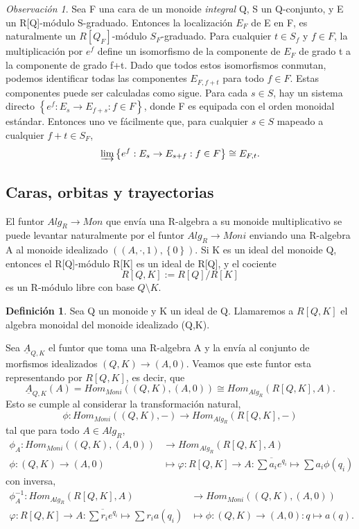 \documentclass[12pt,spanish]{amsart}
\newcommand{\set}[1]{\left\{{#1}\right\}}
\theoremstyle{definition}
\newtheorem{Def}[Theorem]{Definición}
\theoremstyle{remark}
\newtheorem{obs}[Theorem]{Observación}
\begin{document}
\begin{obs}
Sea F una cara de un monoide \textit{integral} Q, S un Q-conjunto, y E un R[Q]-módulo S-graduado. Entonces la localización $E_{F}$ de E en F, es naturalmente un $R[Q_{F}]$-módulo $S_{F}$-graduado. Para cualquier $t\in S_{f}$ y $f\in F$, la multiplicación por $e^{f}$ define un isomorfismo de la componente de $E_{F}$ de grado t a la componente de grado f+t. Dado que todos estos isomorfismos conmutan, podemos identificar todas las componentes $E_{F,f+t}$ para todo $f\in F$. Estas componentes puede ser calculadas como sigue. Para cada $s\in S$, hay un sistema directo $\set{e^{f}: E_{s} \to E_{f+s}: f\in F}$, donde F es equipada con el orden monoidal estándar. Entonces uno ve fácilmente que, para cualquier $s\in S$ mapeado a cualquier $f+t\in S_{F}$,
$$\varinjlim \set{e^{f}:E_{s} \to E_{s+f}:f\in F} \cong E_{F,t}.$$
\end{obs}
 






\subsection{Caras, orbitas y trayectorias}
El funtor $Alg_{R} \to Mon$ que envía una R-algebra a su monoide multiplicativo se puede levantar naturalmente por el funtor $Alg_{R} \to Moni$ enviando una R-algebra A al monoide idealizado $((A,\cdot,1),\set{0})$. Si K es un ideal del monoide Q, entonces el R[Q]-módulo R[K] es un ideal de R[Q], y el cociente 
$$R[Q,K]:=R[Q]/R[K]$$
es un R-módulo libre con base $Q\setminus K$. \\

\begin{Def}
Sea Q un monoide y K un ideal de Q. Llamaremos a $R[Q,K]$ el algebra monoidal del monoide idealizado (Q,K). 
\end{Def}

Sea $\underline{A}_{Q,K}$ el funtor que toma una R-algebra A y la envía al conjunto de morfismos idealizados $(Q,K) \to (A,0)$. Veamos que este funtor esta representando por $R[Q,K]$, es decir, que 
$$\underline{A}_{Q,K}(A)=Hom_{Moni}((Q,K),(A,0)) \cong Hom_{Alg_{R}}(R[Q,K],A).$$
Esto se cumple al considerar la transformación natural,
$$\phi:Hom_{Moni}((Q,K),-) \to Hom_{Alg_{R}}(R[Q,K],-)$$
tal que para todo $A\in Alg_{R}$,
\begin{equation*}
\begin{split}
\phi_{A}:Hom_{Moni}((Q,K),(A,0)) &\to Hom_{Alg_{R}}(R[Q,K],A) \\
\phi:(Q,K) \to (A,0) &\mapsto  \varphi:R[Q,K] \to A:\overline{\sum a_{i}e^{q_{i}}} \mapsto \sum a_{i}\phi(q_{i})
\end{split}
\end{equation*}
con inversa,
\begin{equation*}
\begin{split}
\phi_{A}^{-1}:Hom_{Alg_{R}}(R[Q,K],A) &\to Hom_{Moni}((Q,K),(A,0)) \\
\varphi:R[Q,K] \to A:\overline{\sum r_{i}e^{q_{i}}} \mapsto \sum r_{i}a(q_{i}) &\mapsto \phi:(Q,K) \to (A,0): q \mapsto a(q).   
\end{split}
\end{equation*}
\end{document}
